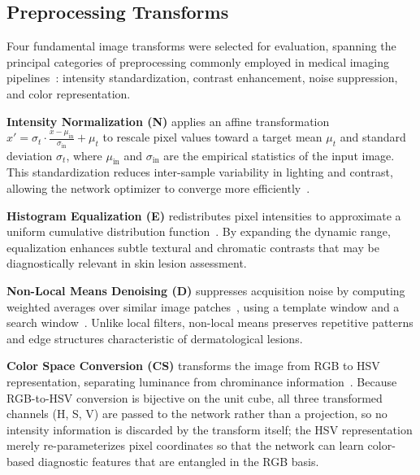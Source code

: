 \documentclass[preprint,5p,times,twocolumn]{elsarticle}
\begin{document}
\subsection{Preprocessing Transforms}

Four fundamental image transforms were selected for evaluation, spanning the principal categories of preprocessing commonly employed in medical imaging pipelines~\cite{Brinker2019, RODRIGUES2020103542, Tarawneh2024, computers8030062}: intensity standardization, contrast enhancement, noise suppression, and color representation.

\textbf{Intensity Normalization (N)} applies an affine transformation $x' = \sigma_t \cdot \frac{x - \mu_{\text{in}}}{\sigma_{\text{in}}} + \mu_t$ to rescale pixel values toward a target mean $\mu_t$ and standard deviation $\sigma_t$, where $\mu_{\text{in}}$ and $\sigma_{\text{in}}$ are the empirical statistics of the input image. This standardization reduces inter-sample variability in lighting and contrast, allowing the network optimizer to converge more efficiently~\cite{10.5555/1076432}.

\textbf{Histogram Equalization (E)} redistributes pixel intensities to approximate a uniform cumulative distribution function~\cite{10.5555/1076432, 9025640, 10810559, Reza2004}. By expanding the dynamic range, equalization enhances subtle textural and chromatic contrasts that may be diagnostically relevant in skin lesion assessment.

\textbf{Non-Local Means Denoising (D)} suppresses acquisition noise by computing weighted averages over similar image patches~\cite{Buades2005}, using a template window and a search window~\cite{MAFI2019236, elad2023imagedenoisingdeeplearning}. Unlike local filters, non-local means preserves repetitive patterns and edge structures characteristic of dermatological lesions.

\textbf{Color Space Conversion (CS)} transforms the image from RGB to HSV representation, separating luminance from chrominance information~\cite{WANG2018157, ballester2022influencecolorspacesdeep}. Because RGB-to-HSV conversion is bijective on the unit cube, all three transformed channels (H, S, V) are passed to the network rather than a projection, so no intensity information is discarded by the transform itself; the HSV representation merely re-parameterizes pixel coordinates so that the network can learn color-based diagnostic features that are entangled in the RGB basis.
\end{document}
